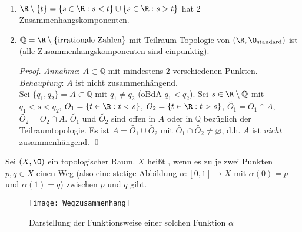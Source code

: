 \begin{example}[Zusammenhangskomponenten]
  \
  \begin{enumerate}
    \item \( \R \setminus \{ t \} = \{ s \in \R : s < t \} \cup \{ s \in \R : s > t \} \) hat 2 Zusammenhangskomponenten.
    \item \( \mathbb{Q} = \R \setminus \{ \text{irrationale Zahlen} \} \) mit Teilraum-Topologie von \( (\R, \O_\text{standard}) \) ist  (alle Zusammenhangskomponenten sind einpunktig). \\
    \begin{proof}
      \emph{Annahme}: \( A \subset \mathbb{Q} \) mit mindestens \( 2 \) verschiedenen Punkten. \\
      \emph{Behauptung}: \( A \) ist nicht zusammenhängend. \\
      Sei \( \{ q_1, q_2 \} = A \subset \mathbb{Q} \) mit \( q_1 \neq q_2 \) (oBdA \( q_1 < q_2 \)). Sei \( s \in \R \setminus \mathbb{Q} \) mit \( q_1 < s < q_2 \), \( O_1 = \{ t \in \R: t < s \} \), \( O_2 = \{ t \in \R : t > s \} \), \( \widetilde{O_1} = O_1 \cap A \), \( \widetilde{O_2} = O_2 \cap A \). \( \widetilde{O_1} \) und \( \widetilde{O_2} \) sind offen in \( A \) oder in \( \mathbb{Q} \) bezüglich der Teilraumtopologie. Es ist \( A = \widetilde{O_1} \cup \widetilde{O_2} \) mit \( \widetilde{O_1} \cap \widetilde{O_2} \neq \varnothing \), d.h. \( A \) ist \emph{nicht} zusammenhängend. \qed{}
    \end{proof}
  \end{enumerate}
\end{example}

\begin{definition}[Weg-Zusammenhängend]\label{def:wegzusammenhaengend}
  Sei \( (X, \O) \) ein topologischer Raum. \( X \) heißt , wenn es zu je zwei Punkten \( p, q \in X \) einen Weg (also eine stetige Abbildung \( \alpha : [0,1] \to X \) mit \( \alpha(0) = p \) und \( \alpha(1) = q \)) zwischen \( p \) und \( q \) gibt.
  \begin{figure}[H]
    \texttt{[image: Wegzusammenhang]}
    \caption{Darstellung der Funktionsweise einer solchen Funktion \( \alpha \)}
  \end{figure}
\end{definition}


